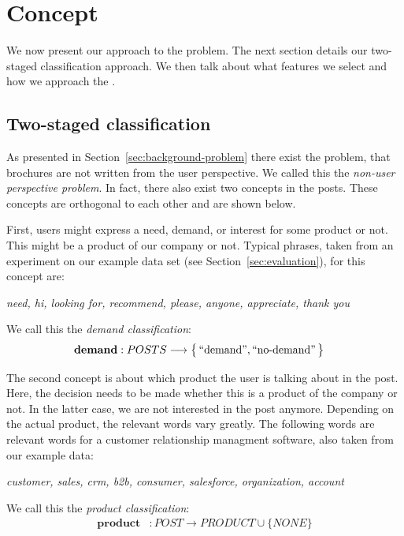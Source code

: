 \section{Concept}
\label{sec:concept}
We now present our approach to the \nto problem.
The next section details our two-staged classification approach.
We then talk about what features we select and how we approach the .

\subsection{Two-staged classification}
As presented in Section~\ref{sec:background-problem} there exist the problem, that brochures are not written from the user perspective.
We called this the \emph{non-user perspective problem}.
In fact, there also exist two concepts in the posts.
These concepts are orthogonal to each other and are shown below.

First, users might express a need, demand, or interest for some product or not.
This might be a product of our company or not.
Typical phrases, taken from an experiment on our example data set (see Section~\ref{sec:evaluation}), for this concept are:
\begin{center}
	\textit{need, hi, looking for, recommend, please, anyone, appreciate, thank you}
\end{center}
We call this the \emph{demand classification}:
\begin{align*}
	\mathbf{demand}&: POSTS \longrightarrow \big\{ \operatorname{``demand''}, \operatorname{``no-demand''} \big\}
\end{align*}

The second concept is about which product the user is talking about in the post.
Here, the decision needs to be made whether this is a product of the company or not.
In the latter case, we are not interested in the post anymore.
Depending on the actual product, the relevant words vary greatly.
The following words are relevant words for a customer relationship managment software, also taken from our example data:
\begin{center}
	\textit{customer, sales, crm, b2b, consumer, salesforce, organization, account}
\end{center}

We call this the \emph{product classification}:
\begin{align*}
	\mathbf{product}&: POST \longrightarrow  PRODUCT \cup \big\{ NONE \big\}
\end{align*}

